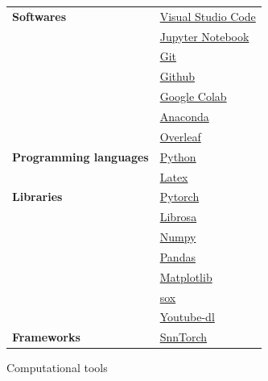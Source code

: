 \documentclass[11pt]{article}
\begin{document}
\begin{figure}[h]
  \begin{center}
    \begin{tabularx}{\textwidth}{|X|X|}
      \hline
      \textbf{Softwares}  & \href{https://code.visualstudio.com/}{Visual Studio Code}     \\
                          & \href{https://jupyter.org/}{Jupyter Notebook}                 \\
                          & \href{https://git-scm.com/}{Git}                              \\
                          & \href{https://github.com/}{Github}                            \\
                          & \href{https://colab.research.google.com/}{Google Colab}       \\
                          & \href{https://www.anaconda.com/products/individual}{Anaconda} \\
                          & \href{https://www.overleaf.com/}{Overleaf}                    \\
      \hline
      \textbf{Programming languages}
                          & \href{https://www.python.org/}{Python}                        \\
                          & \href{https://www.latex-project.org/}{Latex}                  \\
      \hline
      \textbf{Libraries}  & \href{https://pytorch.org/}{Pytorch}                          \\
                          & \href{https://librosa.org/doc/latest/index.html}{Librosa}     \\
                          & \href{https://numpy.org/}{Numpy}                              \\
                          & \href{https://pandas.pydata.org/}{Pandas}                     \\
                          & \href{https://matplotlib.org/}{Matplotlib}                    \\
                          & \href{https://pysox.readthedocs.io/en/latest/}{sox}           \\
                          & \href{https://github.com/ytdl-org/youtube-dl}{Youtube-dl}     \\
      \hline
      \textbf{Frameworks} & \href{https://github.com/eriksoper/SnnTorch}{SnnTorch}        \\
      \hline
    \end{tabularx}
  \end{center}
  \caption{Computational tools}
\end{figure}
\end{document}
